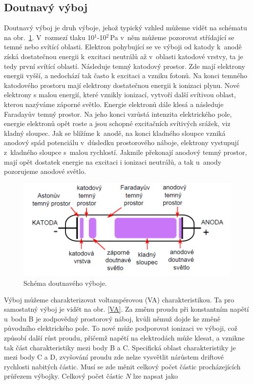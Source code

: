 \documentclass[a4paper,12pt]{article}
\begin{document}
\subsection{Doutnavý výboj}
Doutnavý výboj je druh výboje, jehož typický vzhled můžeme vidět na schématu na 
obr.~\ref{glowdischarge}. V~rozmezí tlaku 10$^1$-10$^2$\,\si{\pascal} v~něm 
můžeme 
pozorovat střídající se temné nebo svítící oblasti. Elektron pohybující se ve 
výboji od katody k~anodě získá dostatečnou energii k~excitaci neutrálů až 
v~oblasti katodové vrstvy, ta je tedy první svítící oblastí. Následuje temný 
katodový prostor. Zde mají elektrony energii vyšší, a nedochází tak často k 
excitaci a vzniku fotonů. Na konci temného katodového prostoru mají elektrony 
dostatečnou energii k ionizaci plynu. Nové elektrony s malou energií, které 
vznikly ionizací, vytvoří další svítivou oblast, kterou nazýváme záporné 
světlo. Energie elektronů dále klesá a následuje Faradayův temný prostor. Na 
jeho konci vzrůstá intenzita elektrického pole, energie elektronů opět roste a 
jsou schopné excitačních svítivých srážek, viz kladný sloupec. Jak se blížíme 
k~anodě, na konci kladného sloupce vzniká anodový spád potenciálu v~důsledku 
prostorového náboje, elektrony vystupují z~kladného sloupce s~malou rychlostí. 
Jakmile překonají anodový temný prostor, mají opět dostatek energie na excitaci 
i ionizaci neutrálů, a tak u~anody pozorujeme anodové světlo.

\begin{figure}[h]
	\centering
	\includegraphics[width=130mm]{glowdischarge.png}
	\caption{Schéma doutnavého výboje.}
	\label{glowdischarge}
\end{figure}

Výboj můžeme charakterizovat voltampérovou (VA) charakteristikou. Ta pro 
samostatný výboj je vidět na obr. \ref{VA}. Za změnu proudu při konstantním 
napětí u~bodu B je zodpovědný prostorový náboj, kvůli němuž dojde ke změně 
původního elektrického pole. To nové může podporovat ionizaci ve výboji, což 
způsobí další růst proudu, přičemž napětí na elektrodách může klesat, a vznikne 
tak část charakteristiky mezi body B a C. Specifická oblast charakteristiky je 
mezi body C a D, zvyšování proudu zde nelze vysvětlit nárůstem driftové 
rychlosti nabitých částic. Musí se zde měnit celkový počet částic 
procházejících průřezem výbojky. Celkový počet částic $N$ lze napsat jako
\end{document}

